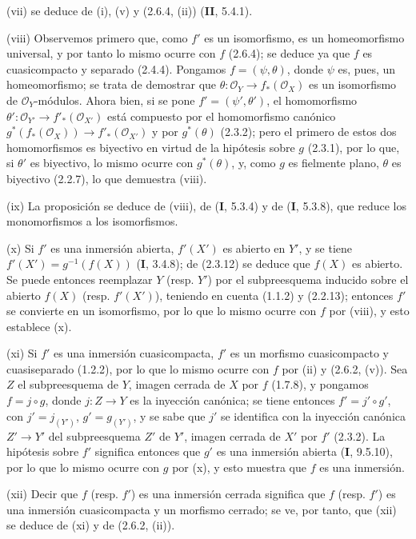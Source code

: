 (vii) se deduce de (i), (v) y (2.6.4, (ii)) (\textbf{II}, 5.4.1).

(viii) Observemos primero que, como $f'$ es un isomorfismo, es un
homeomorfismo universal, y por tanto lo mismo ocurre con $f$ (2.6.4); se
deduce ya que $f$ es cuasicompacto y separado (2.4.4). Pongamos
$f=(\psi,\theta)$, donde $\psi$ es, pues, un homeomorfismo; se trata de
demostrar que
$\theta:\mathcal O_Y\to f_*(\mathcal O_X)$
es un isomorfismo de $\mathcal O_Y$-módulos. Ahora bien, si se pone
$f'=(\psi',\theta')$, el homomorfismo
$\theta':\mathcal O_{Y'}\to f'_*(\mathcal O_{X'})$ está compuesto por el
homomorfismo canónico
$g^*(f_*(\mathcal O_X))\to f'_*(\mathcal O_{X'})$ y por $g^*(\theta)$
(2.3.2); pero el primero de estos dos homomorfismos es biyectivo en virtud de
la hipótesis sobre $g$ (2.3.1), por lo que, si $\theta'$ es biyectivo,
lo mismo ocurre con $g^*(\theta)$, y, como $g$ es fielmente plano, $\theta$ es
biyectivo (2.2.7), lo que demuestra (viii).

(ix) La proposición se deduce de (viii), de (\textbf I, 5.3.4) y de (\textbf I, 5.3.8),
que reduce los monomorfismos a los isomorfismos.

(x) Si $f'$ es una inmersión abierta, $f'(X')$ es abierto en $Y'$, y
se tiene $f'(X')=g^{-1}(f(X))$ (\textbf I, 3.4.8); de (2.3.12) se deduce que $f(X)$
es abierto. Se puede entonces reemplazar $Y$ (resp. $Y'$) por el subpreesquema
inducido sobre el abierto $f(X)$ (resp. $f'(X')$), teniendo en cuenta (1.1.2)
y (2.2.13); entonces $f'$ se convierte en un isomorfismo, por lo que lo mismo
ocurre con $f$ por (viii), y esto establece (x).

(xi) Si $f'$ es una inmersión cuasicompacta, $f'$ es un morfismo
cuasicompacto y cuasiseparado (1.2.2), por lo que lo mismo ocurre con $f$ por
(ii) y (2.6.2, (v)). Sea $Z$ el subpreesquema de $Y$, imagen cerrada de $X$
por $f$ (1.7.8), y pongamos $f=j\circ g$, donde $j:Z\to Y$ es la inyección
canónica; se tiene entonces $f'=j'\circ g'$, con $j'=j_{(Y')}$,
$g'=g_{(Y')}$, y se sabe que $j'$ se identifica con la inyección canónica
$Z'\to Y'$ del subpreesquema $Z'$ de $Y'$, imagen cerrada de $X'$ por $f'$
(2.3.2). La hipótesis sobre $f'$ significa entonces que $g'$ es una inmersión
abierta (\textbf I, 9.5.10), por lo que lo mismo ocurre con $g$ por (x), y esto muestra
que $f$ es una inmersión.

(xii) Decir que $f$ (resp. $f'$) es una inmersión cerrada significa que
$f$ (resp. $f'$) es una inmersión cuasicompacta y un morfismo cerrado; se ve,
por tanto, que (xii) se deduce de (xi) y de (2.6.2, (ii)).

